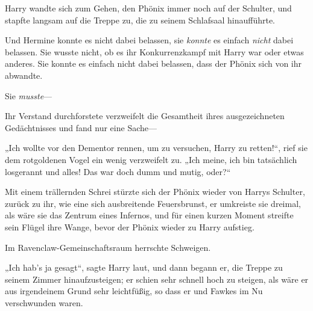 Harry wandte sich zum Gehen, den Phönix immer noch auf der Schulter, und stapfte langsam auf die Treppe zu, die zu seinem Schlafsaal hinaufführte.

Und Hermine konnte es nicht dabei belassen, sie \emph{konnte} es einfach \emph{nicht} dabei belassen. Sie wusste nicht, ob es ihr Konkurrenzkampf mit Harry war oder etwas anderes. Sie konnte es einfach nicht dabei belassen, dass der Phönix sich von ihr abwandte.

Sie \emph{musste}—

Ihr Verstand durchforstete verzweifelt die Gesamtheit ihres ausgezeichneten Gedächtnisses und fand nur eine Sache—

„Ich wollte vor den Dementor rennen, um zu versuchen, Harry zu retten!“, rief sie dem rotgoldenen Vogel ein wenig verzweifelt zu. „Ich meine, ich bin tatsächlich losgerannt und alles! Das war doch dumm und mutig, oder?“

Mit einem trällernden Schrei stürzte sich der Phönix wieder von Harrys Schulter, zurück zu ihr, wie eine sich ausbreitende Feuersbrunst, er umkreiste sie dreimal, als wäre sie das Zentrum eines Infernos, und für einen kurzen Moment streifte sein Flügel ihre Wange, bevor der Phönix wieder zu Harry aufstieg.

Im Ravenclaw-Gemeinschaftsraum herrschte Schweigen.

„Ich hab’s ja gesagt“, sagte Harry laut, und dann begann er, die Treppe zu seinem Zimmer hinaufzusteigen; er schien sehr schnell hoch zu steigen, als wäre er aus irgendeinem Grund sehr leichtfüßig, so dass er und Fawkes im Nu verschwunden waren.

